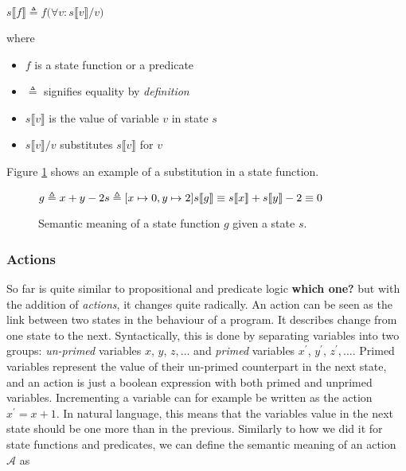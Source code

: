 \documentclass[english, biblatex, digitaloutput]{kththesis}
\begin{document}
\begin{math}
	s \llbracket f \rrbracket \triangleq f \lparen \forall v : s \llbracket v \rrbracket / v \rparen
\end{math}

where

\begin{itemize}
	\item $f$ is a state function or a predicate
	\item $\triangleq$ signifies equality by \textit{definition}
	\item $s \llbracket v \rrbracket$ is the value of variable $v$ in state $s$
	\item $s \llbracket v \rrbracket / v$ substitutes  $s \llbracket v \rrbracket$ for $v$
\end{itemize}

Figure \ref{fig:state-function-example} shows an example of a substitution in a state function.

\begin{figure}
	\begin{math}
		g \triangleq x + y - 2 \\
		s \triangleq \lbrack x \mapsto 0, y \mapsto 2 \rbrack \\
		s \llbracket g \rrbracket \equiv s \llbracket x \rrbracket + s \llbracket y \rrbracket - 2 \equiv 0
	\end{math}
	\caption{Semantic meaning of a state function $g$ given a state $s$.}
	\label{fig:state-function-example}
\end{figure}

\subsubsection{Actions}

So far  is quite similar to propositional and predicate logic \textbf{which one?} but with the addition of \textit{actions}, it changes quite radically. An action can be seen as the link between two states in the behaviour of a program. It describes change from one state to the next. Syntactically, this is done by separating variables into two groups: \textit{un-primed} variables $x$, $y$, $z, \dotsc$ and \textit{primed} variables $x^\prime$, $y^\prime$, $z^\prime, \dotsc$. Primed variables represent the value of their un-primed counterpart in the next state, and an action is just a boolean expression with both primed and unprimed variables. Incrementing a variable can for example be written as the action $x^\prime = x + 1$. In natural language, this means that the variables value in the next state should be one more than in the previous. Similarly to how we did it for state functions and predicates, we can define the semantic meaning of an action $\mathcal{A}$ as
\end{document}
